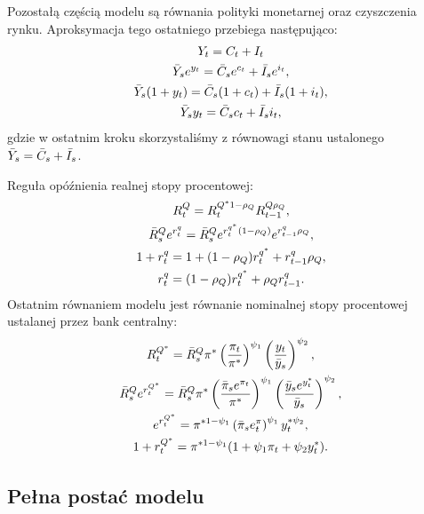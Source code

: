 Pozostałą częścią modelu są równania polityki monetarnej oraz czyszczenia rynku. Aproksymacja tego ostatniego przebiega następująco:
\begin{gather}
    Y_t = C_t + I_t \\
    \bar{Y}_se^{y_t} = \bar{C}_se^{c_t} + \bar{I}_se^{i_t}, \\
    \bar{Y}_s(1 + y_t) = \bar{C}_s(1 + c_t) + \bar{I}_s(1 + i_t), \\
    \bar{Y}_sy_t = \bar{C}_s c_t + \bar{I}_s i_t,
\end{gather}
gdzie w ostatnim kroku skorzystaliśmy z równowagi stanu ustalonego $\bar{Y}_s = \bar{C}_s + \bar{I}_s$. 

Reguła opóźnienia realnej stopy procentowej:
\begin{gather}
    R^Q_t = R_t^{Q^*1-\rho_Q} R_{t-1}^{Q\rho_Q}, \\
    \bar{R}_s^Q e^{r^q_t} = \bar{R}_s^Q e^{r^{q^*}_t(1-\rho_Q)} e^{r^q_{t-1}\rho_Q}, \\
    1 + r^q_t = 1 + (1-\rho_Q)r^{q^*}_t + r^q_{t-1} \rho_Q , \\
    r^q_t = (1-\rho_Q)r^{q^*}_t + \rho_Q r^q_{t-1}.
\end{gather}
Ostatnim równaniem modelu jest równanie nominalnej stopy procentowej ustalanej przez bank centralny:
\begin{gather}
    R^{Q^*}_t = \bar{R}_s^Q \pi^* \left( \frac{\pi_t}{\pi^*}\right)^{\psi_1} \left(\frac{y_t}{\bar{y}_s}\right)^{\psi_2}, \\
    \bar{R}_s^Q e^{r_t^{Q^*}} = \bar{R}_s^Q \pi^* \left( \frac{\bar{\pi}_s e^{\pi_t}}{\pi^*}\right)^{\psi_1} \left(\frac{\bar{y}_s e^{y^*_t}}{\bar{y}_s}\right)^{\psi_2}, \\
    e^{r^{Q^*}_t} = \pi^{*1-\psi_1} \left(\bar{\pi}_s e^\pi_t\right)^{\psi_1} y_t^{*\psi_2}, \\
    1 + r^{Q^*}_t = \pi^{*1-\psi_1} ( 1 + \psi_1 \pi_t + \psi_2 y^*_t).
\end{gather}

\subsection{Pełna postać modelu}
\label{sec:full_linear_model_sample}

